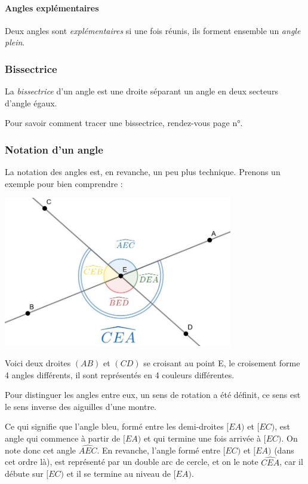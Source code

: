 \documentclass[a4paper, twoside]{article}
\begin{document}
\paragraph*{Angles explémentaires}

Deux angles sont \emph{explémentaires} si une fois réunis, ils forment ensemble un \textit{angle plein}.


\subsubsection*{Bissectrice}

La \emph{bissectrice} d'un angle est une droite séparant un angle en deux secteurs d'angle égaux.

Pour savoir comment tracer une bissectrice, rendez-vous page n°\pageref{tracer_mediatrice_bissectrice}.


\newpage

\subsubsection*{Notation d'un angle}

La notation des angles est, en revanche, un peu plus technique.
Prenons un exemple pour bien comprendre :

\begin{center}
	\includegraphics[width=10cm]{Image/Angles/notation_angle.jpg}
\end{center}

Voici deux droites $(AB)$ et $(CD)$ se croisant au point E, le croisement forme 4 angles différents,
il sont représentés en 4 couleurs différentes.

Pour distinguer les angles entre eux, un sens de rotation a été définit,
ce sens est le sens inverse des aiguilles d'une montre.

Ce qui signifie que l'angle bleu, formé entre les demi-droites $[EA)$ et $[EC)$,
est angle qui commence à partir de $[EA)$ et qui termine une fois arrivée à $[EC)$.
On note donc cet angle $\widehat{AEC}$. En revanche, l'angle formé entre $[EC)$ et $[EA)$
(dans cet ordre là), est représenté par un double arc de cercle, et on le note $\widehat{CEA}$,
car il débute sur $[EC)$ et il se termine au niveau de $[EA)$.
\end{document}
